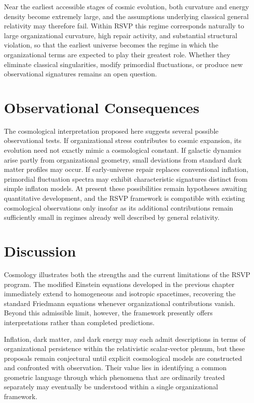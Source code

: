 \documentclass[11pt,oneside]{book}
\numberwithin{equation}{chapter}
\theoremstyle{definition}
\theoremstyle{plain}
\begin{document}
Near the earliest accessible stages of cosmic evolution, both curvature and energy density become extremely large, and the assumptions underlying classical general relativity may therefore fail. Within RSVP this regime corresponds naturally to large organizational curvature, high repair activity, and substantial structural violation, so that the earliest universe becomes the regime in which the organizational terms are expected to play their greatest role. Whether they eliminate classical singularities, modify primordial fluctuations, or produce new observational signatures remains an open question.

\section{Observational Consequences}

The cosmological interpretation proposed here suggests several possible observational tests. If organizational stress contributes to cosmic expansion, its evolution need not exactly mimic a cosmological constant. If galactic dynamics arise partly from organizational geometry, small deviations from standard dark matter profiles may occur. If early-universe repair replaces conventional inflation, primordial fluctuation spectra may exhibit characteristic signatures distinct from simple inflaton models. At present these possibilities remain hypotheses awaiting quantitative development, and the RSVP framework is compatible with existing cosmological observations only insofar as its additional contributions remain sufficiently small in regimes already well described by general relativity.

\section{Discussion}

Cosmology illustrates both the strengths and the current limitations of the
RSVP program. The modified Einstein equations developed in the previous
chapter immediately extend to homogeneous and isotropic spacetimes,
recovering the standard Friedmann equations whenever organizational
contributions vanish. Beyond this admissible limit, however, the framework
presently offers interpretations rather than completed predictions.

Inflation, dark matter, and dark energy may each admit descriptions in terms
of organizational persistence within the relativistic scalar-vector plenum,
but these proposals remain conjectural until explicit cosmological models
are constructed and confronted with observation. Their value lies in
identifying a common geometric language through which phenomena that are
ordinarily treated separately may eventually be understood within a single
organizational framework.
\end{document}
